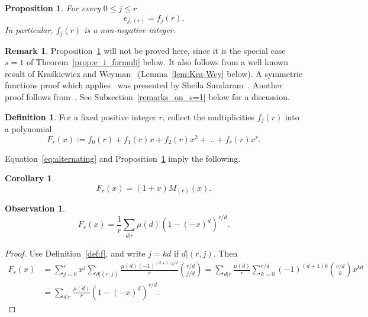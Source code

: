\documentclass[10pt]{article}
\newtheorem{proposition}[theorem]{Proposition}
\newtheorem{corollary}[theorem]{Corollary}
\theoremstyle{definition}
\newtheorem{definition}[theorem]{Definition}
\newtheorem{remark}[theorem]{Remark}
\newtheorem{observation}[cdrthm]{Observation}
\begin{document}
\begin{proposition}\label{prop:e_i_formuli1}
    For every $0\le j\le r$ 
    \[
        e_{j,(r)} = f_j(r).
    \]
    In particular, $f_j(r)$ is a non-negative integer.
\end{proposition}

\begin{remark}\label{rem:e=s}
    Proposition~\ref{prop:e_i_formuli1} will not be proved here, since it is the special case $s=1$ of Theorem~\ref{prop:e_i_formuli} below. 
    It also follows from a well known result of Kra\'skiewicz and Weyman~\cite{KraskiewiczWeyman} (Lemma~\ref{lem:Kra-Wey} below).
    A symmetric functions proof which applies~\cite[Lemma 2.7]{Sundaram_Adv} was presented by Sheila Sundaram~\cite{Sundaram_personal}. 
    Another proof follows from~\cite[Theorem 3.1]{ET}. 
    See Subsection~\ref{remarks_on_s=1} below for a discussion.
\end{remark}
  
\begin{definition}\label{def:F_polynomial}
    For a fixed positive integer $r$, collect the multiplicities $f_j(r)$ into a polynomial
    \[
	    F_r(x) := f_0(r) + f_1(r)x + f_2(r)x^2+ \ldots + f_r(r)x^r.
    \]
\end{definition}

Equation~\eqref{eq:alternating} and Proposition~\ref{prop:e_i_formuli1} imply the following. 

\begin{corollary}\label{t:F_and_M}
    \[
        F_r(x) = (1+x) M_{(r)}(x).
    \]
\end{corollary}

\begin{observation}\label{t:F}
    \[
        F_r(x) = \frac{1}{r} \sum_{d|r} \mu(d) (1-(-x)^d)^{r/d}.
    \]
\end{observation}

\begin{proof}
    Use Definition~\ref{def:f}, and write $j = kd$ if $d | (r,j)$. Then
    \begin{align*}
        F_r(x) 
        &= \sum_{j=0}^{r} x^j \sum_{d|(r,j)} \frac{\mu(d) (-1)^{(d+1)j/d}}{r} \binom{r/d}{j/d} 
        = \sum_{d|r} \frac{\mu(d)}{r} \sum_{k=0}^{r/d} (-1)^{(d+1)k} \binom{r/d}{k}x^{k d} \\
        &= \sum_{d|r} \frac{\mu(d)}{r} (1-(-x)^d)^{r/d}.
    \end{align*}

\end{proof}
	
\end{document}
